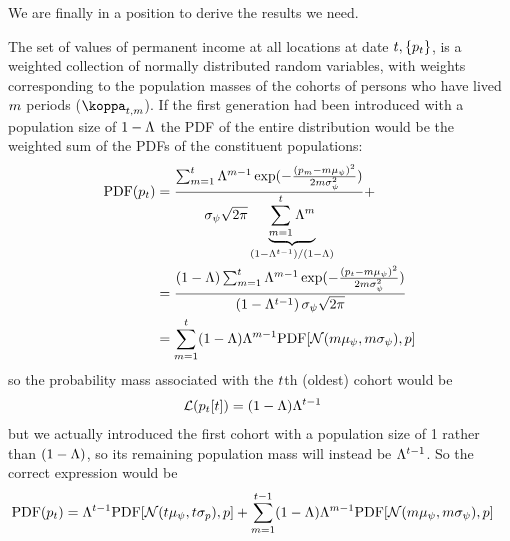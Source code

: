 \documentclass[\econtexRoot/BufferStockTheory.tex]{subfiles}
\begin{document}
We are finally in a position to derive the results we need.

The set of values of permanent income at all locations at date $t,\{p_{t}\}$, is a weighted collection of normally distributed random variables, with weights corresponding to the population masses of the cohorts of persons who have lived $m$ periods ($\wgt_{\FutPer,\LooPer}$).  If the first generation had been introduced with a population size of $1-\Lambda$ the PDF of the entire distribution would be the weighted sum of the PDFs of the constituent populations:
\begin{align}\label{eq:limInvariantP}
  \textrm{PDF}(p_{t}) & = \frac{\sum _{m=1}^{t} 
                          \Lambda^{m-1}
                          \exp({-\frac{(p_{m}-m \mu_{\psi} )^2}{2
                          m \sigma_{\psi} ^2}})}{
                          \sigma_{\psi} \sqrt{2 \pi }
                          \underbrace{
                          \sum_{m=1}^{t}\Lambda^{m}
                          }_{\left(1-\Lambda^{t-1}\right)/(1-\Lambda)}
                          }+
  \\ &= \frac{                            \left(1-\Lambda\right) \sum _{m=1}^{t} 
       \Lambda^{m-1}
       \exp({-\frac{(p_{t}-m \mu_{\psi} )^2}{
       2                      m \sigma_{\psi} ^2}})}{
       \left(1-\Lambda^{t-1}\right)
       \sigma_{\psi} \sqrt{2 \pi }
       }
  \\     & = \sum_{m=1}^{t}(1-\Lambda)\Lambda^{m-1} \textrm{PDF}[\mathcal{N}(m \mu_{\psi},m \sigma_{\psi}),p] \label{eq:pdfsum}
\end{align}
so the probability mass associated with the $t$th (oldest) cohort would be
\begin{align}
  \mathcal{L}(p_{t}[t]) &= (1-\Lambda)\Lambda^{t-1}
                                     \label{eq:wgtLast}
\end{align}
but we actually introduced the first cohort with a population size of 1 rather than $(1-\Lambda)$, so its remaining population mass will instead be $\Lambda^{t-1}$. So the correct expression would be 
\begin{align}
  \textrm{PDF}(p_{t})      & = \Lambda^{t-1}\textrm{PDF}[\mathcal{N}(t \mu_{\psi}, t \sigma_{p}),p]+\sum_{m=1}^{t-1}(1-\Lambda)\Lambda^{m-1} \textrm{PDF}[\mathcal{N}(m \mu_{\psi},m \sigma_{\psi}),p] \label{eq:PDFp}
\end{align}
\end{document}
